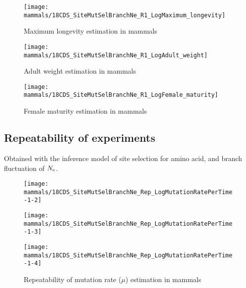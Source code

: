 \begin{figure}[H]
    \centering
    \texttt{[image: mammals/18CDS\_SiteMutSelBranchNe\_R1\_LogMaximum\_longevity]}
    \caption[Maximum longevity estimation in mammals]{Maximum longevity estimation in mammals}
\end{figure}

\begin{figure}[H]
    \centering
    \texttt{[image: mammals/18CDS\_SiteMutSelBranchNe\_R1\_LogAdult\_weight]}
    \caption[Adult weight estimation in mammals]{Adult weight estimation in mammals}
\end{figure}

\begin{figure}[H]
    \centering
    \texttt{[image: mammals/18CDS\_SiteMutSelBranchNe\_R1\_LogFemale\_maturity]}
    \caption[Female maturity estimation in mammals]{Female maturity estimation in mammals}
\end{figure}

\subsection{Repeatability of experiments}
Obtained with the inference model of site selection for amino acid, and branch fluctuation of $N_{\mathrm{e}}$.

\begin{figure}[H]
    \centering
    \begin{minipage}{0.32\linewidth}
        \texttt{[image: mammals/18CDS\_SiteMutSelBranchNe\_Rep\_LogMutationRatePerTime-1-2]}
    \end{minipage} \hfill
    \begin{minipage}{0.32\linewidth}
        \texttt{[image: mammals/18CDS\_SiteMutSelBranchNe\_Rep\_LogMutationRatePerTime-1-3]}
    \end{minipage} \hfill
    \begin{minipage}{0.32\linewidth}
        \texttt{[image: mammals/18CDS\_SiteMutSelBranchNe\_Rep\_LogMutationRatePerTime-1-4]}
    \end{minipage}
    \caption[Repeatability of mutation rate estimation in mammals]{Repeatability of mutation rate ($\mu$) estimation in mammals}
\end{figure}

